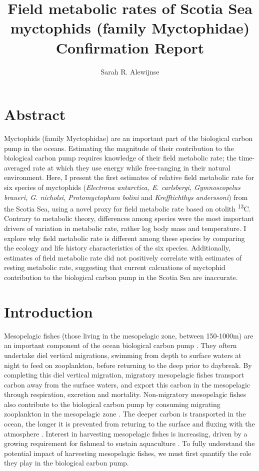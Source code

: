 \documentclass[12pt, titlepage]{article}
\title{Field metabolic rates of Scotia Sea myctophids (family Myctophidae)\\
\large{Confirmation Report}}
\author{Sarah R. Alewijnse}
\begin{document}
\maketitle
\tableofcontents
\pagebreak

\section{Abstract}

Myctophids (family Myctophidae) are an important part of the biological carbon pump in the oceans.
Estimating the magnitude of their contribution to the biological carbon pump requires knowledge of their field metabolic rate; the time-averaged rate at which they use energy while free-ranging in their natural environment.
Here, I present the first estimates of relative field metabolic rate for six species of myctophids (\textit{Electrona antarctica, E. carlsbergi, Gymnoscopelus braueri, G. nicholsi, Protomyctophum bolini} and \textit{Krefftichthys anderssoni}) from the Scotia Sea, using a novel proxy for field metabolic rate based on otolith \textdelta \textsuperscript{13}C.
Contrary to metabolic theory, differences among species were the most important drivers of variation in metabolic rate, rather log body mass and temperature.
I explore why field metabolic rate is different among these species by comparing the ecology and life history characteristics of the six species.
Additionally, estimates of field metabolic rate did not positively correlate with estimates of resting metabolic rate, suggesting that current calcuations of myctophid contribution to the biological carbon pump in the Scotia Sea are inaccurate.

\pagebreak
\section{Introduction}

Mesopelagic fishes (those living in the mesopelagic zone, between 150-1000m) are an important component of the ocean biological carbon pump \citep{Anderson2018, Trueman2014}.
They oftern undertake diel vertical migrations, swimming from depth to surface waters at night to feed on zooplankton, before returning to the deep prior to daybreak.
By completing this diel vertical migration, migratory mesopelagic fishes transport carbon away from the surface waters, and export this carbon in the mesopelagic through respiration, excretion and mortality. 
Non-migratory mesopelagic fishes also contribute to the biological carbon pump by consuming migrating zooplankton in the mesopelagic zone \citep{Davison2013}.
The deeper carbon is transported in the ocean, the longer it is prevented from returing to the surface and fluxing with the atmosphere \citep{Passow2012}.
Interest in harvesting mesopelagic fishes is increasing, driven by a growing requirement for fishmeal to sustain aquaculture \citep{Catul2011, Davison2013, StJohn2016}.
To fully understand the potential impact of harvesting mesopelagic fishes, we must first quantify the role they play in the biological carbon pump.
\end{document}
